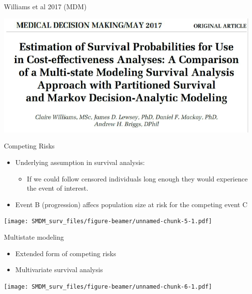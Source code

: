 \documentclass[ignorenonframetext,]{beamer}
\providecommand{\tightlist}{%
  \setlength{\itemsep}{0pt}\setlength{\parskip}{0pt}}
\begin{document}
\begin{frame}

Williams et al 2017 (MDM)

\includegraphics[width=1\linewidth]{figures/williams2017}

\end{frame}

\begin{frame}{Competing Risks}

\begin{itemize}
\tightlist
\item
  Underlying assumption in survival analysis:

  \begin{itemize}
  \tightlist
  \item
    If we could follow censored individuals long enough they would
    experience the event of interest.
  \end{itemize}
\item
  Event B (progression) affecs population size at risk for the competing
  event C
\end{itemize}

\end{frame}

\begin{frame}

\texttt{[image: SMDM\_surv\_files/figure-beamer/unnamed-chunk-5-1.pdf]}

\end{frame}

\begin{frame}{Multistate modeling}

\begin{itemize}
\tightlist
\item
  Extended form of competing risks
\item
  Multivariate survival analysis
\end{itemize}

\texttt{[image: SMDM\_surv\_files/figure-beamer/unnamed-chunk-6-1.pdf]}

\end{frame}
\end{document}
